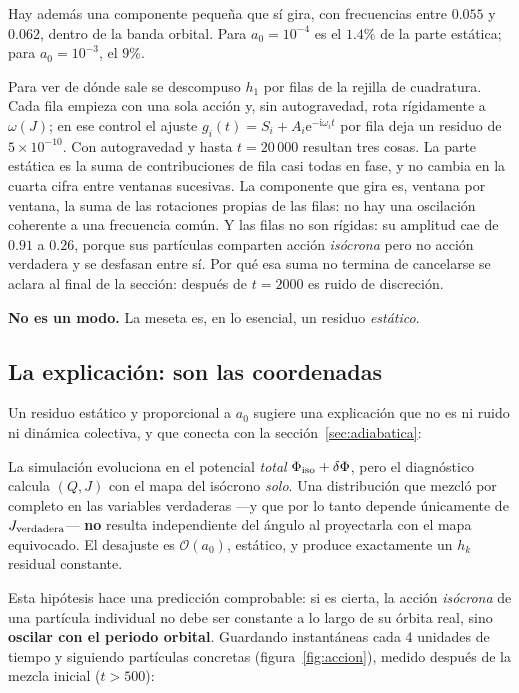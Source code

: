 \documentclass[11pt,a4paper]{article}
\newcommand{\ee}{\mathrm{e}}
\newcommand{\ii}{\mathrm{i}}
\newcommand{\Jr}{J}
\newcommand{\Qr}{Q}
\theoremstyle{definition}
\begin{document}
Hay además una componente pequeña que sí gira, con frecuencias entre $0.055$ y
$0.062$, dentro de la banda orbital. Para $a_0=10^{-4}$ es el $1.4\%$ de la parte
estática; para $a_0=10^{-3}$, el $9\%$.

Para ver de dónde sale se descompuso $h_1$ por filas de la rejilla de cuadratura.
Cada fila empieza con una sola acción y, sin autogravedad, rota rígidamente a
$\omega(\Jr)$; en ese control el ajuste $g_i(t)=S_i+A_i\ee^{-\ii\omega_it}$ por fila
deja un residuo de $5\times10^{-10}$. Con autogravedad y hasta $t=20\,000$ resultan
tres cosas. La parte estática es la suma de contribuciones de fila casi todas en fase,
y no cambia en la cuarta cifra entre ventanas sucesivas. La componente que gira es,
ventana por ventana, la suma de las rotaciones propias de las filas: no hay una
oscilación coherente a una frecuencia común. Y las filas no son rígidas: su amplitud
cae de $0.91$ a $0.26$, porque sus partículas comparten acción \emph{isócrona} pero no
acción verdadera y se desfasan entre sí. Por qué esa suma no termina de cancelarse
se aclara al final de la sección: después de $t=2000$ es ruido de discreción.

\textbf{No es un modo.} La meseta es, en lo esencial, un residuo \emph{estático}.

\subsection{La explicación: son las coordenadas}

Un residuo estático y proporcional a $a_0$ sugiere una explicación que no es ni
ruido ni dinámica colectiva, y que conecta con la sección~\ref{sec:adiabatica}:

\begin{idea}
La simulación evoluciona en el potencial \emph{total} $\Phi_{\rm iso}+\delta\Phi$,
pero el diagnóstico calcula $(\Qr,\Jr)$ con el mapa del isócrono \emph{solo}. Una
distribución que mezcló por completo en las variables verdaderas ---y que por lo
tanto depende únicamente de $\Jr_{\rm verdadera}$--- \textbf{no} resulta
independiente del ángulo al proyectarla con el mapa equivocado. El desajuste es
$\mathcal{O}(a_0)$, estático, y produce exactamente un $h_k$ residual constante.
\end{idea}

Esta hipótesis hace una predicción comprobable: si es cierta, la acción
\emph{isócrona} de una partícula individual no debe ser constante a lo largo de su
órbita real, sino \textbf{oscilar con el periodo orbital}. Guardando instantáneas
cada 4 unidades de tiempo y siguiendo partículas concretas (figura~\ref{fig:accion}),
medido después de la mezcla inicial ($t>500$):
\end{document}

